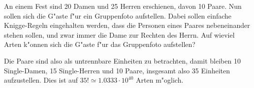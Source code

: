 An einem Fest sind 20 Damen und 25 Herren erschienen, davon
10 Paare. Nun sollen sich die G"aste f"ur ein Gruppenfoto aufstellen.
Dabei sollen einfache Knigge-Regeln eingehalten werden, dass
die Personen eines Paares nebeneinander stehen sollen, und zwar immer
die Dame zur Rechten des Herrn. Auf wieviel Arten k"onnen sich
die G"aste f"ur das Gruppenfoto aufstellen?

\begin{loesung}
Die Paare sind also als untrennbare Einheiten zu betrachten, damit
bleiben 10 Single-Damen, 15 Single-Herren und 10 Paare,
insgesamt also 35 Einheiten aufzustellen.
Dies ist auf $35!\simeq 1.0333\cdot 10^{40}$ Arten m"oglich.
\end{loesung}

